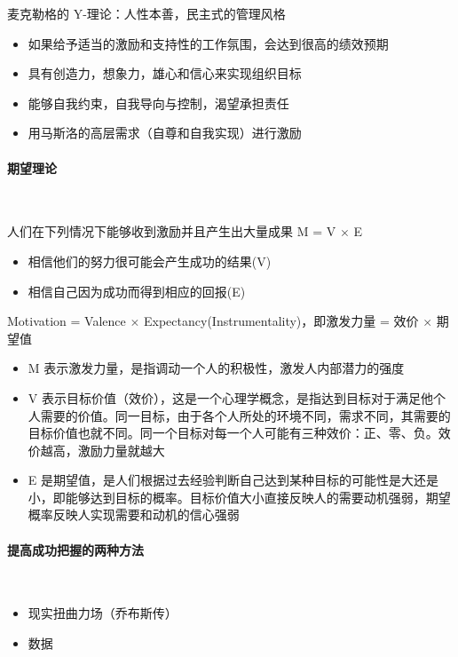 麦克勒格的 Y-理论：人性本善，民主式的管理风格
\vspace{-0.8em}
\begin{multicols}{2}
    \begin{itemize}
        \item 如果给予适当的激励和支持性的工作氛围，会达到很高的绩效预期
        \item 具有创造力，想象力，雄心和信心来实现组织目标
        \item 能够自我约束，自我导向与控制，渴望承担责任
        \item 用马斯洛的高层需求（自尊和自我实现）进行激励
    \end{itemize}
\end{multicols}
\vspace{-1em}

\paragraph{期望理论}~{} \par
人们在下列情况下能够收到激励并且产生出大量成果 M = V $\times$ E
\vspace{-0.8em}
\begin{multicols}{2}
    \begin{itemize}
        \item 相信他们的努力很可能会产生成功的结果(V)
        \item 相信自己因为成功而得到相应的回报(E)
    \end{itemize}
\end{multicols}
\vspace{-1em}

Motivation = Valence $\times$ Expectancy(Instrumentality)，即激发力量 = 效价 $\times$ 期望值
\begin{itemize}
    \item M 表示激发力量，是指调动一个人的积极性，激发人内部潜力的强度
    \item V 表示目标价值（效价），这是一个心理学概念，是指达到目标对于满足他个人需要的价值。同一目标，由于各个人所处的环境不同，需求不同，其需要的目标价值也就不同。同一个目标对每一个人可能有三种效价：正、零、负。效价越高，激励力量就越大
    \item E 是期望值，是人们根据过去经验判断自己达到某种目标的可能性是大还是小，即能够达到目标的概率。目标价值大小直接反映人的需要动机强弱，期望概率反映人实现需要和动机的信心强弱
\end{itemize}

\paragraph{提高成功把握的两种方法}~{} \par
\vspace{-0.8em}
\begin{multicols}{2}
    \begin{itemize}
        \item 现实扭曲力场（乔布斯传）
        \item 数据
    \end{itemize}
\end{multicols}
\vspace{-1em}

